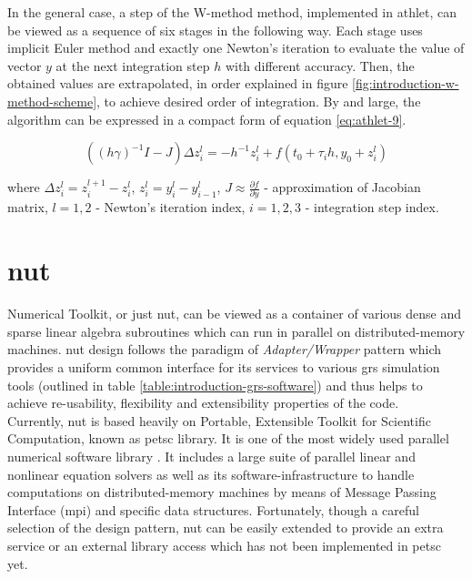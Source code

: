 In the general case, a step of the W-method method, implemented in \acrshort{athlet}, can be viewed as a sequence of six stages in the following way. Each stage uses implicit Euler method and exactly one Newton's iteration to evaluate the value of vector $y$ at the next integration step $h$ with different accuracy. Then, the obtained values are extrapolated, in order explained in figure \ref{fig:introduction-w-method-scheme}, to achieve desired order of integration. By and large, the algorithm can be expressed in a compact form of equation \ref{eq:athlet-9}.

\begin{equation} \label{eq:athlet-9}
	((h \gamma)^{-1}I - J) \Delta z^{l}_{i} = - h^{-1} z^{l}_{i} + f(t_0 + \tau_{i} h, y_{0} + z^{l}_{i})
\end{equation}

where $\Delta z^{l}_{i} = z^{l+1}_{i} - z^{l}_{i}$, $z^{l}_{i} = y^{l}_{i} - y^{l}_{i - 1}$, $J \approx \frac{\partial f}{\partial y}$ - approximation of Jacobian matrix, $l = 1,2$ - Newton's iteration index, $i = 1, 2, 3$ - integration step index.\\


\section{\acrshort{nut}}

Numerical Toolkit, or just \acrshort{nut}, can be viewed as a container of various dense and sparse linear algebra subroutines which can run in parallel on distributed-memory machines. \acrshort{nut} design follows the paradigm of \textit{Adapter/Wrapper} pattern which provides a uniform common interface for its services to various \acrshort{grs} simulation tools (outlined in table \ref{table:introduction-grs-software}) and thus helps to achieve re-usability, flexibility and extensibility properties of the code.\\


Currently, \acrshort{nut} is based heavily on Portable, Extensible Toolkit for Scientific Computation, known as \acrshort{petsc} library. It is one of the most widely used parallel numerical software  library \cite{wiki:petsc-general-info}. It includes a large suite of parallel linear and nonlinear equation solvers as well as its software-infrastructure to handle computations on distributed-memory machines by means of Message Passing Interface (\acrshort{mpi}) and specific data structures. Fortunately, though a careful selection of the design pattern, \acrshort{nut} can be easily extended to provide an extra service or an external library access which has not been implemented in \acrshort{petsc} yet.\\ 



